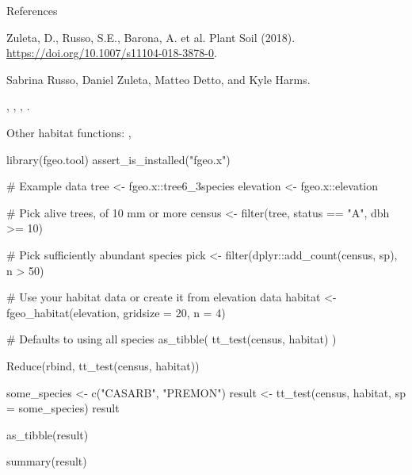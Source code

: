 \documentclass[a4paper]{book}
\begin{document}
%
\begin{Section}{References}

Zuleta, D., Russo, S.E., Barona, A. et al. Plant Soil (2018).
\url{https://doi.org/10.1007/s11104-018-3878-0}.
\end{Section}
%
\begin{Author}\relax
Sabrina Russo, Daniel Zuleta, Matteo Detto, and Kyle Harms.
\end{Author}
%
\begin{SeeAlso}\relax
{}, , ,
.

Other habitat functions: ,
\end{SeeAlso}
%
\begin{Examples}
\begin{ExampleCode}
library(fgeo.tool)
assert_is_installed("fgeo.x")

# Example data
tree <- fgeo.x::tree6_3species
elevation <- fgeo.x::elevation

# Pick alive trees, of 10 mm or more
census <- filter(tree, status == "A", dbh >= 10)

# Pick sufficiently abundant species
pick <- filter(dplyr::add_count(census, sp), n > 50)

# Use your habitat data or create it from elevation data
habitat <- fgeo_habitat(elevation, gridsize = 20, n = 4)

# Defaults to using all species
as_tibble(
  tt_test(census, habitat)
)

Reduce(rbind, tt_test(census, habitat))

some_species <- c("CASARB", "PREMON")
result <- tt_test(census, habitat, sp = some_species)
result

as_tibble(result)

summary(result)
\end{ExampleCode}
\end{Examples}
\printindex{}
\end{document}
